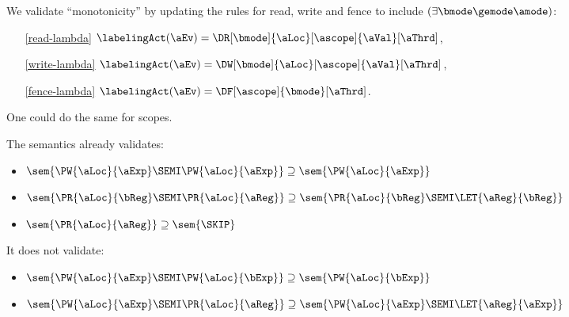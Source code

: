 We validate ``monotonicity'' by updating the rules for read, write and fence
to include $(\exists\bmode\gemode\amode)$:
\begin{multicols}{3}
  \begin{enumerate}
  \item[\eqref{read-lambda}]
    $\labelingAct(\aEv) = \DR[\bmode]{\aLoc}[\ascope]{\aVal}[\aThrd]$,
  \item[\eqref{write-lambda}]
    $\labelingAct(\aEv) = \DW[\bmode]{\aLoc}[\ascope]{\aVal}[\aThrd]$,
  \item[\eqref{fence-lambda}]
    $\labelingAct(\aEv) = \DF[\ascope]{\bmode}[\aThrd]$.
  \end{enumerate}
\end{multicols}
One could do the same for scopes.


The semantics already validates:
\begin{itemize}
\item $\sem{\PW{\aLoc}{\aExp}\SEMI\PW{\aLoc}{\aExp}}\supseteq\sem{\PW{\aLoc}{\aExp}}$
\item $\sem{\PR{\aLoc}{\bReg}\SEMI\PR{\aLoc}{\aReg}}\supseteq\sem{\PR{\aLoc}{\bReg}\SEMI\LET{\aReg}{\bReg}}$
\item $\sem{\PR{\aLoc}{\aReg}}\supseteq\sem{\SKIP}$
\end{itemize}
It does not validate:
\begin{itemize}
\item $\sem{\PW{\aLoc}{\aExp}\SEMI\PW{\aLoc}{\bExp}}\supseteq\sem{\PW{\aLoc}{\bExp}}$
\item $\sem{\PW{\aLoc}{\aExp}\SEMI\PR{\aLoc}{\aReg}}\supseteq\sem{\PW{\aLoc}{\aExp}\SEMI\LET{\aReg}{\aExp}}$
\end{itemize}



